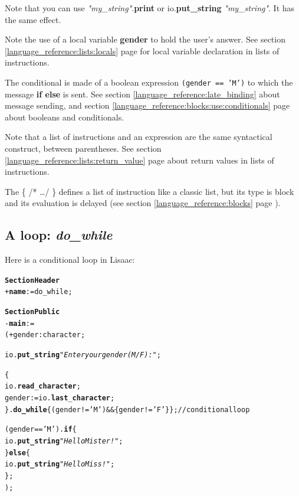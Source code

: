 \documentclass[11pt]{mybook}
\begin{document}
Note that you can use {\it{}"my\_string"}.{\bf{}print} or
 {\sc{}io}.{\bf{}put\_string} {\it{}"my\_string"}. It has the same effect.

Note the use of a local variable {\bf{}gender} to hold the user's answer.
See section \ref{language_reference:lists:locals} page \pageref{language_reference:lists:locals}
for local variable declaration in lists of instructions.

The conditional is made of a boolean expression {\tt{}(gender == 'M')} to
which the message {\bf{}if else } is sent.
See section \ref{language_reference:late_binding} about message sending, and section
\ref{language_reference:blocks:use:conditionals} page \pageref{language_reference:blocks:use:conditionals} about booleans
and conditionals.

Note that a list of instructions and an expression are the same
syntactical construct, between parentheses.
See section \ref{language_reference:lists:return_value} page
\pageref{language_reference:lists:return_value} about return values 
in lists of instructions. 

The \{ /* \ldots */ \} defines a list of instruction like a classic 
list, but its type is {\sc{}block} and its evaluation is delayed 
(see section \ref{language_reference:blocks} page \pageref{language_reference:blocks}).

\subsection{A loop: {\it{}do\_while}}
\label{quickstart:write:loop}
%
Here is a conditional loop in Lisaac:

\begin{alltt} 
{\bf{}Section Header}
  + {\bf{}name} := {\sc{}do\_while};
  
{\bf{}Section Public}
  - {\bf{}main} := 
    ( + gender:{\sc{}character};   

      {\sc{}io}.{\bf{}put\_string} {\it{}"Enter your gender (M/F) : "};

      \{
        {\sc{}io}.{\bf{}read}{\tt{}_}{\bf{}character};
        gender := {\sc{}io}.{\bf{}last}{\tt{}_}{\bf{}character};
      \}.{\bf{}do\_while} \{(gender != 'M') && \{gender != 'F'\}\}; // conditional loop

      (gender == 'M').{\bf{}if} \{     
        {\sc{}io}.{\bf{}put\_string} {\it{}"Hello Mister !"};   
      \} {\bf{}else} \{
        {\sc{}io}.{\bf{}put\_string} {\it{}"Hello Miss !"}; 
      \};
    );
\end{alltt}
\end{document}
